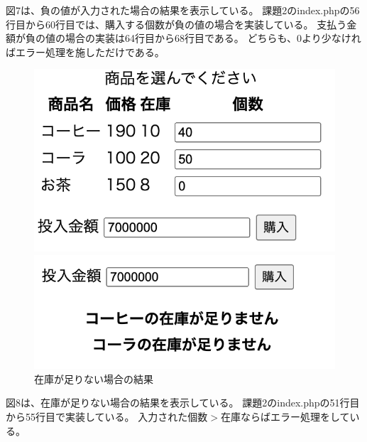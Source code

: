 \documentclass[12pt]{jarticle}
\begin{document}
図7は、負の値が入力された場合の結果を表示している。
課題2のindex.phpの56行目から60行目では、購入する個数が負の値の場合を実装している。
支払う金額が負の値の場合の実装は64行目から68行目である。
どちらも、0より少なければエラー処理を施しただけである。
\begin{figure}[h]
    \begin{minipage}{0.5\hsize}
        \begin{center}
            \includegraphics[scale=0.4]{kadai2_2_8.png}
        \end{center}
    \end{minipage}
    \begin{minipage}{0.5\hsize}
        \begin{center}
            \includegraphics[scale=0.4]{kadai2_2_9.png}
        \end{center}
    \end{minipage}
    \caption{在庫が足りない場合の結果}
\end{figure}

図8は、在庫が足りない場合の結果を表示している。
課題2のindex.phpの51行目から55行目で実装している。
$入力された個数>在庫$ならばエラー処理をしている。

\clearpage
\end{document}
